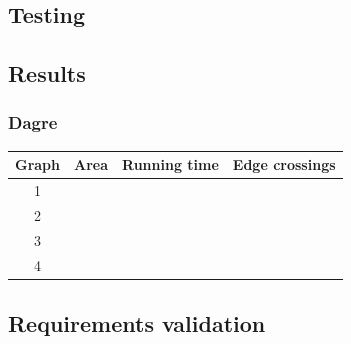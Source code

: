 \begin{landscape}

\section{Testing}



\subsection{Results}

\subsubsection{Dagre}

\begin{tabular}{ | c | c | c | c | }
    \hline
    Graph & Area & Running time & Edge crossings \\
    \hline
    1     & & & \\
    \hline
    2     & & & \\
    \hline
    3     & & & \\
    \hline
    4     & & & \\
    \hline
\end{tabular}



\end{landscape}


\subsection{Requirements validation}


